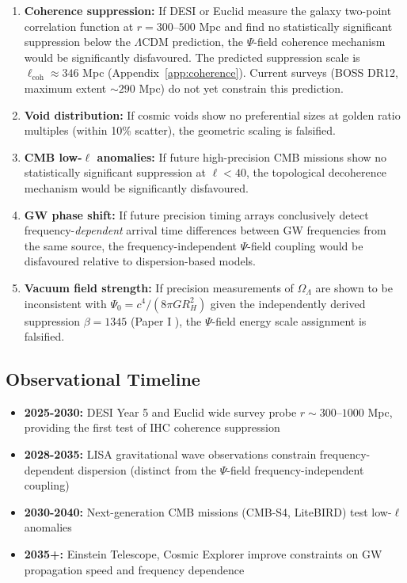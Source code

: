 \begin{enumerate}
\item \textbf{Coherence suppression:} If DESI or Euclid measure the galaxy two-point correlation function at $r = 300$--$500$ Mpc and find no statistically significant suppression below the $\Lambda$CDM prediction, the $\Psi$-field coherence mechanism would be significantly disfavoured. The predicted suppression scale is $\ell_{\text{coh}} \approx 346$ Mpc (Appendix~\ref{app:coherence}). Current surveys (BOSS DR12, maximum extent $\sim 290$ Mpc) do not yet constrain this prediction.

\item \textbf{Void distribution:} If cosmic voids show no preferential sizes at golden ratio multiples (within 10\% scatter), the geometric scaling is falsified.

\item \textbf{CMB low-$\ell$ anomalies:} If future high-precision CMB missions show no statistically significant suppression at $\ell < 40$, the topological decoherence mechanism would be significantly disfavoured.

\item \textbf{GW phase shift:} If future precision timing arrays conclusively detect frequency-\textit{dependent} arrival time differences between GW frequencies from the same source, the frequency-independent $\Psi$-field coupling would be disfavoured relative to dispersion-based models.

\item \textbf{Vacuum field strength:} If precision measurements of $\Omega_\Lambda$ are shown to be inconsistent with $\Psi_0 = c^4/(8\pi G R_H^2)$ given the independently derived suppression $\beta = 1345$ (Paper I \citep{Peacock2026a}), the $\Psi$-field energy scale assignment is falsified.
\end{enumerate}

\subsection{Observational Timeline}

\begin{itemize}
\item \textbf{2025-2030:} DESI Year 5 and Euclid wide survey probe $r \sim 300$--$1000$ Mpc, providing the first test of IHC coherence suppression
\item \textbf{2028-2035:} LISA gravitational wave observations constrain frequency-dependent dispersion (distinct from the $\Psi$-field frequency-independent coupling)
\item \textbf{2030-2040:} Next-generation CMB missions (CMB-S4, LiteBIRD) test low-$\ell$ anomalies
\item \textbf{2035+:} Einstein Telescope, Cosmic Explorer improve constraints on GW propagation speed and frequency dependence
\end{itemize}

